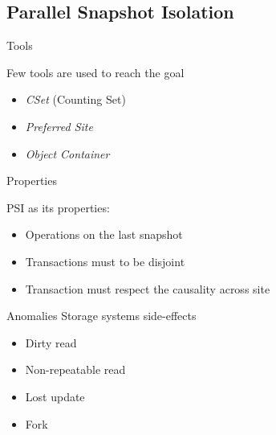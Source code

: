 \documentclass{beamer}
\begin{document}
	\subsection{Parallel Snapshot Isolation}
		\begin{frame}{Tools}
		
			Few tools are used to reach the goal
		
			\begin{itemize}[<+->]		
		
			\item\emph{CSet} (Counting Set)
			
			\item\emph{Preferred Site}
			
			\item\emph{Object Container}
			
			\end{itemize}			
			
		\end{frame}
		
		\begin{frame}{Properties}
		
		PSI as its properties:		
		
		\begin{itemize}
		\item Operations on the last snapshot
		\item Transactions must to be disjoint
		\item Transaction must respect the causality across site 
		\end{itemize}
		
		\end{frame}	


		\begin{frame}{Anomalies}		
		Storage systems side-effects
		\begin{itemize}[<+->]
		\item Dirty read
		\item Non-repeatable read
		\item Lost update
		\item Fork
		\end{itemize}		
		
		\end{frame}

\end{document}
